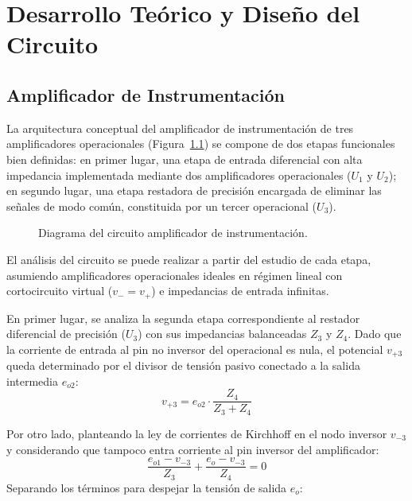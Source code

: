 \chapter{Desarrollo Teórico y Diseño del Circuito}
\label{sec:desarrollo_diseno}

\section{Amplificador de Instrumentación}

La arquitectura conceptual del amplificador de instrumentación de tres amplificadores operacionales (Figura~\ref{crkt:amp_inst_teorico}) se compone de dos etapas funcionales bien definidas: en primer lugar, una etapa de entrada diferencial con alta impedancia implementada mediante dos amplificadores operacionales ($U_1$ y $U_2$); en segundo lugar, una etapa restadora de precisión encargada de eliminar las señales de modo común, constituida por un tercer operacional ($U_3$).

\begin{figure}[!ht]
  \centering
  \caption{Diagrama del circuito amplificador de instrumentación.}
  \label{crkt:amp_inst_teorico}
\end{figure}

El análisis del circuito se puede realizar a partir del estudio de cada etapa,
asumiendo amplificadores operacionales ideales en régimen lineal con
cortocircuito virtual ($v_- = v_+$) e impedancias de entrada infinitas.

En primer lugar, se analiza la segunda etapa correspondiente al restador diferencial de precisión ($U_3$) con sus impedancias balanceadas $Z_3$ y $Z_4$. Dado que la corriente de entrada al pin no inversor del operacional es nula, el potencial $v_{+3}$ queda determinado por el divisor de tensión pasivo conectado a la salida intermedia $e_{o2}$:
\begin{equation}
  v_{+3} = e_{o2} \cdot \frac{Z_4}{Z_3 + Z_4}
  \label{eq:paso1_vplus}
\end{equation}

Por otro lado, planteando la ley de corrientes de Kirchhoff en el nodo inversor $v_{-3}$ y considerando que tampoco entra corriente al pin inversor del amplificador:
\begin{equation*}
  \frac{e_{o1} - v_{-3}}{Z_3} + \frac{e_o - v_{-3}}{Z_4} = 0
\end{equation*}
Separando los términos para despejar la tensión de salida $e_o$:

